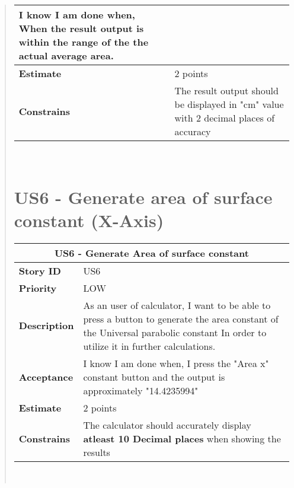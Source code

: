 \documentclass[12pt]{report}
\begin{document}
\begin{quote}
\begin{tabular}{ |p{4cm}|p{10cm}| }
                 I know I am done when,  When the result output is within the range of the the actual average area. \\
                 \hline
                 \textbf{Estimate} &  2  points  \\
                 \hline
                 \textbf{Constrains}& The result output should be displayed in "cm" value with 2 decimal places of  accuracy \\
                 \hline
                 
                \end{tabular}
            \hfill\break\\
            
              \section{US6 - Generate area of surface constant (X-Axis)}
                \begin{tabular}{ |p{4cm}|p{10cm}| }
                 \hline
                 \multicolumn{2}{|c|}{\textbf{US6 - Generate Area of surface constant} } \\
                 \hline
                 \textbf {Story ID}& US6  \\
                 \hline
                 \textbf{Priority} & LOW \\
                 \hline
                 \textbf{Description}   & As an user of calculator, I want to be able to press a button to generate the area constant of the Universal parabolic constant In order to utilize it in further calculations. \\
                 \hline
                 \textbf{Acceptance}& 
                
               I know I am done when, I press the "Area x" constant button and the output is approximately "14.4235994" \\
                 \hline
                 \textbf{Estimate} &  2 points  \\
                 \hline
                 \textbf{Constrains}&  The calculator should accurately display  \textbf{atleast 10 Decimal places} when showing the results   \\
                 \hline
                \end{tabular}
            \hfill\break\\
            
            
             
        
        
            
        \end{quote}
     
\end{document}
